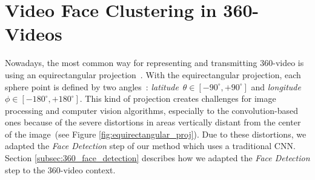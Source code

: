  
\section{Video Face Clustering in 360-Videos}
\label{sec:authoring_clustering_360}

Nowadays, the most common way for representing and transmitting 360-video is using an equirectangular projection~\cite{yang2018object}. With the equirectangular projection, each sphere point is defined by two angles~\cite{snyder1987map}: \emph{latitude}~$\theta \in [-90^{\circ}, +90^{\circ}]$ and \emph{longitude}~$\phi \in [-180^{\circ}, +180^{\circ}]$. This kind of projection creates challenges for image processing and computer vision algorithms, especially to the convolution-based ones because of the severe distortions in areas vertically distant from the center of the image~(see Figure \ref{fig:equirectangular_proj}). Due to these distortions, we adapted the \emph{Face Detection} step of our method which uses a traditional CNN. Section \ref{subsec:360_face_detection} describes how we adapted the \emph{Face Detection} step to the 360-video context.

